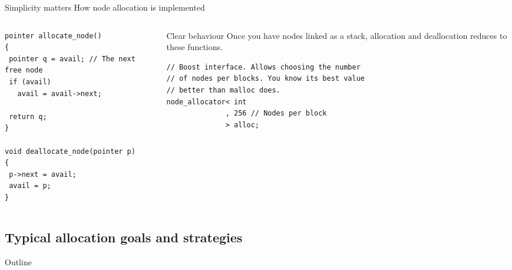\documentclass[10pt,aspectratio=169]{beamer}
\begin{document}
\begin{frame}[fragile]
{Simplicity matters}
{How node allocation is implemented}

\begin{columns}
\begin{column}{0.47\textwidth}
\begin{lstlisting}
pointer allocate_node()
{
 pointer q = avail; // The next free node
 if (avail)
   avail = avail->next;

 return q;
}

void deallocate_node(pointer p)
{
 p->next = avail;
 avail = p;
}
\end{lstlisting}
\end{column}
\begin{column}{0.47\textwidth}
\begin{block} {Clear behaviour}
Once you have nodes linked as a stack, allocation and
deallocation reduces to these functions.
\end{block}
\begin{lstlisting}
// Boost interface. Allows choosing the number
// of nodes per blocks. You know its best value
// better than malloc does.
node_allocator< int
              , 256 // Nodes per block
              > alloc;
\end{lstlisting}
\end{column}
\end{columns}
\end{frame}

\subsection{Typical allocation goals and strategies}

\begin{frame}{Outline}
\end{frame}
\end{document}
